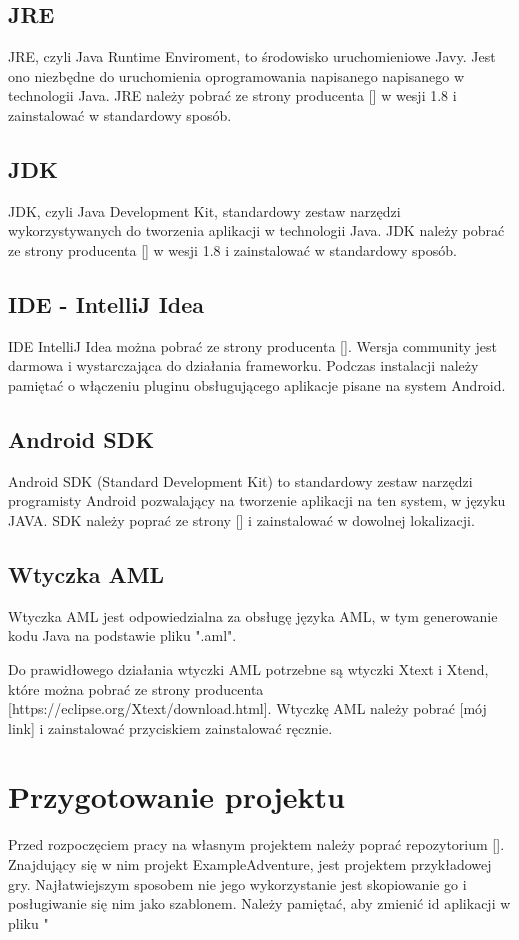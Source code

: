 \documentclass	{xmgr}
\begin{document}
\subsection{JRE}
JRE, czyli Java Runtime Enviroment, to środowisko uruchomieniowe Javy. Jest ono niezbędne do uruchomienia oprogramowania napisanego napisanego w technologii Java. JRE należy pobrać ze strony producenta [] w wesji 1.8 i zainstalować w standardowy sposób.
\subsection{JDK}
JDK, czyli Java Development Kit, standardowy zestaw narzędzi wykorzystywanych do tworzenia aplikacji w technologii Java. JDK należy pobrać ze strony producenta [] w wesji 1.8 i zainstalować w standardowy sposób.
\subsection{IDE - IntelliJ Idea}
IDE IntelliJ Idea można pobrać ze strony producenta []. Wersja community jest darmowa i wystarczająca do działania frameworku.
Podczas instalacji należy pamiętać o włączeniu pluginu obsługującego aplikacje pisane na system Android.
\subsection{Android SDK}
Android SDK (Standard Development Kit) to standardowy zestaw narzędzi programisty Android pozwalający na tworzenie aplikacji na ten system, w języku JAVA. SDK należy poprać ze strony [] i zainstalować w dowolnej lokalizacji.
\subsection{Wtyczka AML}
Wtyczka AML jest odpowiedzialna za obsługę języka AML, w tym generowanie kodu Java na podstawie pliku ".aml". 

Do prawidłowego działania wtyczki AML potrzebne są wtyczki Xtext i Xtend, które można pobrać ze strony producenta [https://eclipse.org/Xtext/download.html].
Wtyczkę AML należy pobrać [mój link] i zainstalować przyciskiem zainstalować ręcznie.

\section{Przygotowanie projektu}
Przed rozpoczęciem pracy na własnym projektem należy poprać repozytorium []. Znajdujący się w nim projekt ExampleAdventure, jest projektem przykładowej gry. Najłatwiejszym sposobem nie jego wykorzystanie jest skopiowanie go i posługiwanie się nim jako szablonem. Należy pamiętać, aby zmienić id aplikacji w pliku "
\end{document}
